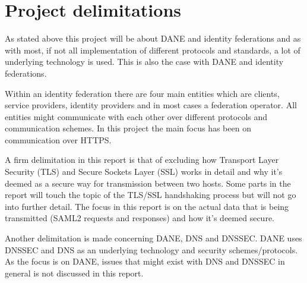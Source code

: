 \section{Project delimitations}
As stated above this project will be about DANE and identity federations and as with most, if not all implementation of different protocols and standards, a lot of underlying technology is used.
This is also the case with DANE and identity federations.

Within an identity federation there are four main entities which are clients, service providers, identity providers and in most cases a federation operator.
All entities might communicate with each other over different protocols and communication schemes.
In this project the main focus has been on communication over HTTPS.

A firm delimitation in this report is that of excluding how Transport Layer Security (TLS) and Secure Sockets Layer (SSL) works in detail and why it's deemed as a secure way for transmission between two hosts.
Some parts in the report will touch the topic of the TLS/SSL handshaking process but will not go into further detail.
The focus in this report is on the actual data that is being transmitted (SAML2 requests and responses) and how it's deemed secure. 

Another delimitation is made concerning DANE, DNS and DNSSEC.
DANE uses DNSSEC and DNS as an underlying technology and security schemes/protocols.
As the focus is on DANE, issues that might exist with DNS and DNSSEC in general is not discussed in this report.







